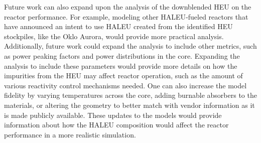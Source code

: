 Future work can also expand upon the analysis of the downblended 
\gls{HEU} on the reactor performance. For example, modeling other 
\gls{HALEU}-fueled reactors that 
have announced an intent to use \gls{HALEU} created from the identified 
\gls{HEU} stockpiles, like the Oklo Aurora, would provide more 
practical analysis. Additionally, future work could expand 
the analysis to include other metrics, such as power peaking factors and 
power distributions in the core. 
Expanding the analysis to include these parameters would provide 
more details on how the impurities from the \gls{HEU} may 
affect reactor operation, such as the amount of various reactivity 
control mechanisms needed. One can also increase the 
model fidelity by varying temperatures across the core, 
adding burnable absorbers to the materials, or altering the 
geometry to better match with vendor information as it is made 
publicly available. These 
updates to the models would provide information 
about how the \gls{HALEU} composition would affect the 
reactor performance in a more realistic simulation. 
